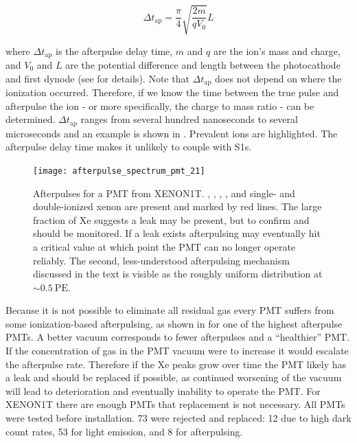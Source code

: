 \begin{equation}
\Delta t_{\mathrm{ap}} = \frac{\pi}{4} \sqrt{\frac{2 m}{q V_{0}}} L
\end{equation}

\noindent where $\Delta t_{\mathrm{ap}}$ is the afterpulse delay time, $m$ and $q$ are the ion's mass and charge, and $V_{0}$ and $L$ are
the potential difference and length between the photocathode and first dynode (see  for details).  Note that
$\Delta t_{\mathrm{ap}}$
does not depend on where the ionization occurred.  Therefore, if we know the time between the true pulse and afterpulse the ion - or more
specifically, the
charge to mass ratio - can be determined.  $\Delta t_{\mathrm{ap}}$ ranges from several hundred nanoseconds to several microseconds and an
example is shown in .  Prevalent ions are highlighted.  The afterpulse delay time makes it
unlikely to couple with S1s.

\begin{figure}
\centering
\texttt{[image: afterpulse\_spectrum\_pmt\_21]}
\caption[Afterpulses for a PMT from XENON1T.  , , , , and single- and double-ionized
xenon are present and marked by red lines.]{Afterpulses for a PMT from XENON1T.  , , , , and
single- and double-ionized
xenon are present and marked by red lines.  The large fraction of Xe suggests a leak may be present, but to confirm  and
 should be monitored.  If a leak exists afterpulsing may eventually hit a critical value at which point
the PMT can no longer operate reliably.  The second, less-understood afterpulsing mechanism discussed in the text is visible as the
roughly uniform distribution at ${\sim}0.5\ \mathrm{PE}$.}
\label{fig:xenon1t_pmts_ap}
\end{figure}

Because it is not possible to eliminate all residual gas every PMT suffers from some ionization-based afterpulsing, as shown in
 for one of the highest afterpulse PMTs.  A better vacuum
corresponds to fewer afterpulses and a ``healthier'' PMT.  If the concentration of gas in the PMT vacuum were to increase
it would
escalate the afterpulse rate.  Therefore if the Xe peaks grow over time the PMT likely has a leak and should
be replaced if possible, as continued worsening of the vacuum will lead to deterioration and eventually inability to operate the
PMT.  For XENON1T there are enough PMTs that replacement is not necessary.  All PMTs were tested before
installation.  73 were rejected and replaced: 12 due to high dark count rates, 53 for light emission, and 8 for
afterpulsing.

